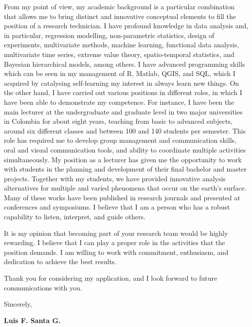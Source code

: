 \documentclass[11pt, a4paper]{awesome-cv}
\begin{document}
\begin{cvletter}
From my point of view, my academic background is a particular combination that allows me to bring distinct and innovative conceptual elements to fill the position of a research technician. I have profound knowledge in data analysis and, in particular, regression modelling, non-parametric statistics, design of experiments, multivariate methods, machine learning, functional data analysis, multivariate time series, extreme value theory, spatio-temporal statistics, and Bayesian hierarchical models, among others. I have advanced programming skills which can be seen in my management of R, Matlab, QGIS, and SQL, which I acquired by catalysing self-learning my interest in always learn new things. On the other hand, I have carried out various positions in different roles, in which I have been able to demonstrate my competence. For instance, I have been the main lecturer at the undergraduate and graduate level in two major universities in Colombia for about eight years, teaching from basic to advanced subjects, around six different classes and between 100 and 140 students per semester. This role has required me to develop group management and communication skills, oral and visual communication tools, and ability to coordinate multiple activities simultaneously. My position as a lecturer has given me the opportunity to work with students in the planning and development of their final bachelor and master projects. Together with my students, we have provided innovative analysis alternatives for multiple and varied phenomena that occur on the earth's surface. Many of these works have been published in research journals and presented at conferences and symposiums. I believe that I am a person who has a robust capability to listen, interpret, and guide others. \par
It is my opinion that becoming part of your research team would be highly rewarding. I believe that I can play a proper role in the activities that the position demands. I am willing to work with commitment, enthusiasm, and dedication to achieve the best results.\par
Thank you for considering my application, and I look forward to future communications with you.\par
Sincerely,\par
{\bf Luis F. Santa G.}
\end{cvletter}


\end{document}
